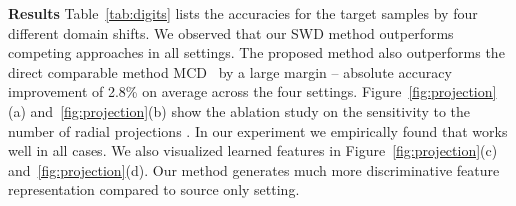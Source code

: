 \documentclass[10pt,twocolumn,letterpaper]{article}
\begin{document}
\vspace{2mm}
\noindent \textbf{Results}
Table~\ref{tab:digits} lists the accuracies for the target samples by four different domain shifts. We observed that our SWD method outperforms competing approaches in all settings. The proposed method also outperforms the direct comparable method MCD~\cite{saito2017maximum} by a large margin -- absolute accuracy improvement of 2.8\% on average across the four settings. Figure~\ref{fig:projection}(a) and~\ref{fig:projection}(b) show the ablation study on the sensitivity to the number of radial projections . In our experiment we empirically found that  works well in all cases. We also visualized learned features in Figure~\ref{fig:projection}(c) and~\ref{fig:projection}(d). Our method generates much more discriminative feature representation compared to source only setting.
\end{document}
